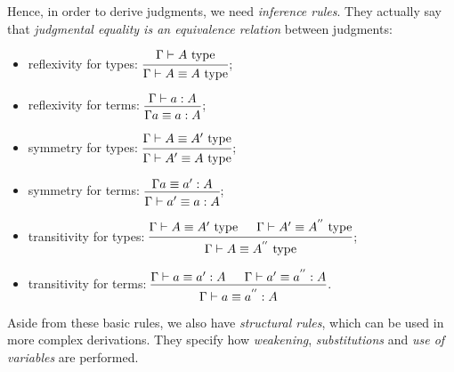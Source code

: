 Hence, in order to derive judgments, we need \emph{inference rules}.
They actually say that  \emph{judgmental equality is %
  an equivalence relation} between judgments:
\begin{itemize}
\item reflexivity for types:
  $ \begin{prooftree}
    \hypo{\Gamma \vdash A \text{ type}}
    \infer1{\Gamma \vdash A \equiv A \text{ type}}
  \end{prooftree}
  $;
\item reflexivity for terms:
  $ \begin{prooftree}
    \hypo{\Gamma \vdash a : A}
    \infer1{\Gamma a \equiv a : A}
  \end{prooftree}
  $;
\item symmetry for types:
  $ \begin{prooftree}
    \hypo{\Gamma \vdash A \equiv A' \text{ type}}
    \infer1{\Gamma \vdash A' \equiv A \text{ type}}
  \end{prooftree}
  $;
\item symmetry for terms:
  $ \begin{prooftree}
    \hypo{\Gamma a \equiv a' : A}
    \infer1{\Gamma \vdash a' \equiv a : A}
  \end{prooftree}
  $;
\item transitivity for types:
  $ \begin{prooftree}
    \hypo{\Gamma \vdash A \equiv A' \text{ type}}
    \hypo{\Gamma \vdash A' \equiv A^{''} \text{ type}}
    \infer2{\Gamma \vdash A \equiv A^{''} \text{ type}}
  \end{prooftree}
  $;
\item transitivity for terms:
  $ \begin{prooftree}
    \hypo{\Gamma \vdash a \equiv a' : A}
    \hypo{\Gamma \vdash a' \equiv a^{''} : A}
    \infer2{\Gamma \vdash a \equiv a^{''} : A}
  \end{prooftree}
  $.
\end{itemize}

Aside from these basic rules, we also have \emph{structural rules}, which
can be used in more complex derivations. They specify how \emph{weakening},
\emph{substitutions} and \emph{use of variables} are performed.

